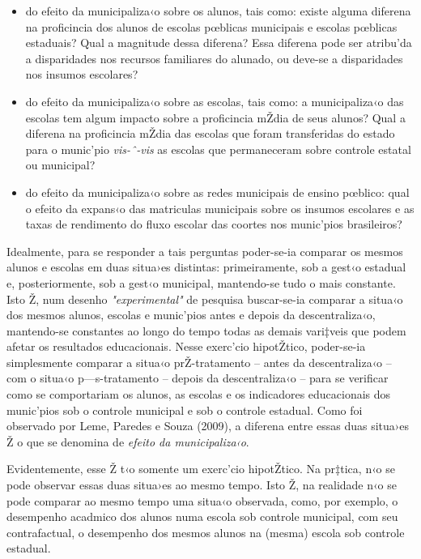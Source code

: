 \documentclass[a4paper, 12pt]{article}
\begin{document}
\begin{itemize}

\item do efeito da municipaliza‹o sobre os alunos, tais como: existe alguma diferena na proficincia dos alunos de escolas pœblicas municipais e escolas pœblicas estaduais? Qual a magnitude dessa diferena? Essa diferena pode ser atribu’da a disparidades nos recursos familiares do alunado, ou deve-se a disparidades nos insumos escolares?

\item do efeito da municipaliza‹o sobre as escolas, tais como: a municipaliza‹o das escolas tem algum impacto sobre a proficincia mŽdia de seus alunos? Qual a diferena na proficincia mŽdia das escolas que foram transferidas do estado para o munic’pio \emph{vis-ˆ-vis} as escolas que permaneceram sobre controle estatal ou municipal?

\item do efeito da municipaliza‹o sobre as redes municipais de ensino pœblico: qual o efeito da expans‹o das matriculas municipais sobre os insumos escolares e as taxas de rendimento do fluxo escolar das coortes nos munic’pios brasileiros?

\end{itemize}


Idealmente, para se responder a tais perguntas poder-se-ia comparar os mesmos alunos e escolas em duas situa›es distintas: primeiramente, sob a gest‹o estadual e, posteriormente, sob a gest‹o municipal, mantendo-se tudo o mais constante. Isto Ž, num desenho \emph{"experimental"}  de pesquisa buscar-se-ia comparar a situa‹o dos mesmos alunos, escolas e munic’pios antes e depois da descentraliza‹o, mantendo-se constantes ao longo do tempo todas as demais vari‡veis que podem afetar os resultados educacionais. Nesse exerc’cio hipotŽtico, poder-se-ia simplesmente comparar a situa‹o prŽ-tratamento -- antes da descentraliza‹o -- com o situa‹o p—s-tratamento -- depois da descentraliza‹o -- para se verificar como se comportariam os alunos, as escolas e os indicadores educacionais dos munic’pios sob o controle municipal e sob o controle estadual. Como foi observado por Leme, Paredes e Souza (2009), a diferena entre essas duas situa›es Ž o que se  denomina de  \emph{efeito da municipaliza‹o}.

Evidentemente, esse Ž t‹o somente um exerc’cio hipotŽtico. Na pr‡tica, n‹o se pode observar essas duas situa›es ao mesmo tempo. Isto Ž, na realidade n‹o se pode comparar ao mesmo tempo uma situa‹o observada, como, por exemplo, o desempenho acadmico dos alunos numa escola sob controle municipal, com seu contrafactual, o desempenho dos mesmos alunos na (mesma) escola sob controle estadual.
\end{document}
